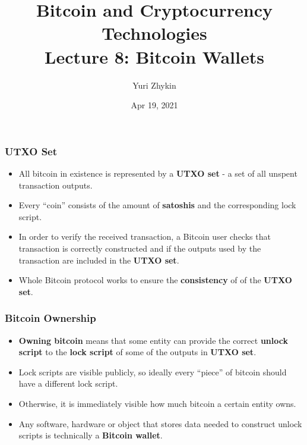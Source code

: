 \documentclass{beamer}
\title{
  Bitcoin and Cryptocurrency Technologies \\
  Lecture 8: Bitcoin Wallets
}
\author{Yuri Zhykin}
\date{Apr 19, 2021}
\begin{document}
\frame{\titlepage}

\begin{frame}
  \frametitle{UTXO Set}
  \begin{itemize}
  \item All bitcoin in existence is represented by a \textbf{UTXO set} - a set
    of all unspent transaction outputs.
  \item Every ``coin'' consists of the amount of \textbf{satoshis} and the
    corresponding lock script.
  \item In order to verify the received transaction, a Bitcoin user checks that
    transaction is correctly constructed and if the outputs used by the
    transaction are included in the \textbf{UTXO set}.
  \item Whole Bitcoin protocol works to ensure the \textbf{consistency} of of
    the \textbf{UTXO set}.
  \end{itemize}
\end{frame}

\begin{frame}
  \frametitle{Bitcoin Ownership}
  \begin{itemize}
  \item \textbf{Owning bitcoin} means that some entity can provide the correct
    \textbf{unlock script} to the \textbf{lock script} of some of the outputs in
    \textbf{UTXO set}.
  \item Lock scripts are visible publicly, so ideally every ``piece'' of bitcoin
    should have a different lock script.
  \item Otherwise, it is immediately visible how much bitcoin a certain entity
    owns.
  \item Any software, hardware or object that stores data needed to construct
    unlock scripts is technically a \textbf{Bitcoin wallet}.
    
  \end{itemize}
\end{frame}
\end{document}
